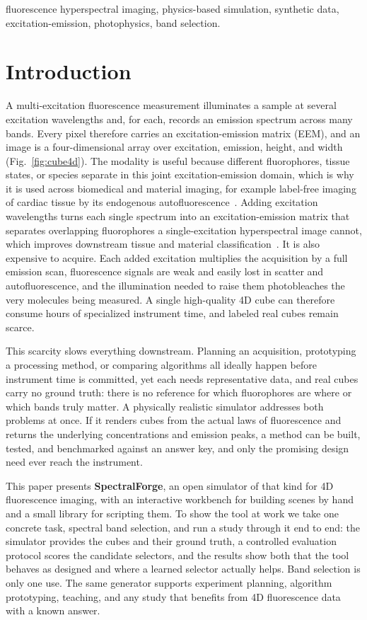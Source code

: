 \documentclass[conference]{IEEEtran}
\begin{document}
\begin{IEEEkeywords}
fluorescence hyperspectral imaging, physics-based simulation, synthetic data,
excitation-emission, photophysics, band selection.
\end{IEEEkeywords}

\section{Introduction}
A multi-excitation fluorescence measurement illuminates a sample at several excitation
wavelengths and, for each, records an emission spectrum across many bands. Every pixel
therefore carries an excitation-emission matrix (EEM), and an image is a four-dimensional
array over excitation, emission, height, and width (Fig.~\ref{fig:cube4d}). The modality is useful because
different fluorophores, tissue states, or species separate in this joint
excitation-emission domain, which is why it is used across biomedical and material
imaging, for example label-free imaging of cardiac tissue by its endogenous
autofluorescence~\cite{ref_mercader,ref_gil}. Adding excitation wavelengths turns each
single spectrum into an excitation-emission matrix that separates overlapping fluorophores
a single-excitation hyperspectral image cannot, which improves downstream tissue and
material classification~\cite{ref_chil4d,ref_chillichen,ref_hunanyan}.
It is also expensive to acquire. Each added excitation multiplies the acquisition by a
full emission scan, fluorescence signals are weak and easily lost in scatter and
autofluorescence, and the illumination needed to raise them photobleaches the very
molecules being measured. A single high-quality 4D cube can therefore consume hours of
specialized instrument time, and labeled real cubes remain scarce.

This scarcity slows everything downstream. Planning an acquisition, prototyping a
processing method, or comparing algorithms all ideally happen before instrument time is
committed, yet each needs representative data, and real cubes carry no ground truth: there
is no reference for which fluorophores are where or which bands truly matter. A physically realistic simulator addresses both problems at once. If it renders cubes from the actual
laws of fluorescence and returns the underlying concentrations and emission peaks, a method
can be built, tested, and benchmarked against an answer key, and only the
promising design need ever reach the instrument.

This paper presents \textbf{SpectralForge}, an open simulator of that kind for 4D
fluorescence imaging, with an interactive workbench for building scenes by hand and a small
library for scripting them. To show the tool at work we take one concrete task, spectral
band selection, and run a study through it end to end: the simulator provides the cubes and
their ground truth, a controlled evaluation protocol scores the candidate selectors, and
the results show both that the tool behaves as designed and where a learned selector
actually helps. Band selection is only one use. The same generator supports experiment
planning, algorithm prototyping, teaching, and any study that benefits from 4D fluorescence
data with a known answer.
\end{document}
